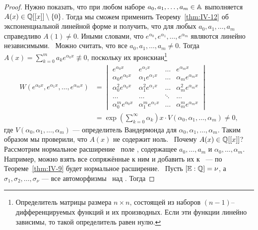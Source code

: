 \begin{proof}
    Нужно показать, что при любом наборе $a_0, a_1, \dots, a_m \in \AA$ выполняется $A(x) \in \QQ[[x]] \setminus \left\{ 0 \right\}$. Тогда мы сможем применить Теорему~\ref{thm:IV-12} об экспоненциальной линейной форме и получить, что для любых $a_0, a_1, \dots, a_m$ справедливо $A(1) \ne 0$. Иными словами, что $e^{\alpha_0}, e^{\alpha_1}, \dots, e^{\alpha_m}$ являются линейно независимыми.~\newline
    Можно считать, что все $a_0, a_1, \dots, a_m \ne 0$. Тогда $A(x) = \sum_{k=0}^{m} a_ke^{\alpha_k x} \not\equiv 0$, поскольку их вронскиан\footnote{Определитель матрицы размера $n \times n$, состоящей из наборов $(n-1)$--дифференцируемых функций и их производных. Если эти функции линейно зависимы, то такой определитель равен нулю.}
    \begin{align*}
        W\left( e^{\alpha_0x}, e^{\alpha_1x}, \dots, e^{\alpha_mx} \right) &= 
        \begin{vmatrix}
                       e^{\alpha_0 x} &            e^{\alpha_1 x} & \dots &            e^{\alpha_m x} \\
              \alpha_0 e^{\alpha_0 x} &   \alpha_1 e^{\alpha_1 x} & \dots &   \alpha_m e^{\alpha_m x} \\
            \alpha_0^2 e^{\alpha_0 x} & \alpha_1^2 e^{\alpha_1 x} & \dots & \alpha_m^2 e^{\alpha_m x} \\
                                \dots &                     \dots & \ddots&                     \dots \\
            \alpha_0^m e^{\alpha_0 x} & \alpha_1^m e^{\alpha_1 x} & \dots & \alpha_m^m e^{\alpha_m x}
        \end{vmatrix} \\
        &= \exp{\left(\sum_{k=0}^\infty \alpha_k\right)x} \cdot V\left(\alpha_0, \alpha_1, \dots, \alpha_m\right) \ne 0,
    \end{align*}
    где $V\left(\alpha_0, \alpha_1, \dots, \alpha_m\right)$ --- определитель Вандермонда для $\alpha_0, \alpha_1, \dots, \alpha_m$. Таким образом мы проверили, что $A(x)$ не содержит ноль.~\newline
    Почему $A(x) \in \QQ[[x]]$? Рассмотрим нормальное расширение \EE~поле \QQ, содержащее $a_0, \dots, a_m$ и $\alpha_0, \dots, \alpha_m$. Например, можно взять все сопряжённые к ним и добавить их к \QQ~--- по Теореме~\ref{thm:IV-9} будет нормальное расширение.~\newline
    Пусть $[\EE : \QQ] = \nu$, а $\sigma_1, \sigma_2, \dots, \sigma_\nu$ --- все автоморфизмы \EE~над \QQ. Тогда

\end{proof}
